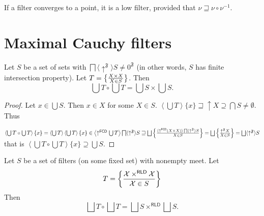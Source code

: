 \begin{cor}
  If a filter converges to a point, it is a low filter, provided that $\nu
  \sqsupseteq \nu \circ \nu^{- 1}$.
\end{cor}

\section{Maximal Cauchy filters}

\begin{lem}
  Let $S$ be a set of sets with $\bigsqcap \langle \uparrow^{\mathfrak{F}}
  \rangle S \neq 0^{\mathfrak{F}}$ (in other words, $S$ has finite
  intersection property). Let $T = \left\{ \frac{ X \times X}{X \in S }\right\}$. Then
  \[ \bigcup T \circ \bigcup T = \bigcup S \times \bigcup S. \]
\end{lem}

\begin{proof}
  Let $x \in \bigcup S$. Then $x \in X$ for some $X \in S$. $\left\langle
  \bigcup T \right\rangle \{ x \} \sqsupseteq \uparrow X \supseteq \bigcap S
  \neq \emptyset$. Thus
  
  $\left\langle \bigcup T \circ \bigcup T \right\rangle \{ x \} = \left\langle
  \bigcup T \right\rangle \left\langle \bigcup T \right\rangle \{ x \} \in
  \left\langle \uparrow^{\mathsf{FCD}} \bigcup T \right\rangle
  \bigsqcap \langle \uparrow^{\mathfrak{F}} \rangle S \sqsupseteq \bigsqcup
  \setcond{ \langle \uparrow^{\mathsf{FCD}} (X \times X) \rangle
  \bigsqcap \langle \uparrow^{\mathfrak{F}} \rangle S }{
  X \in S } = \bigsqcup \setcond{ \uparrow^{\mathfrak{F}} X}{X \in S } =
  \bigsqcup \langle
  \uparrow^{\mathfrak{F}} \rangle S$ that is $\left\langle \bigcup T \circ
  \bigcup T \right\rangle \{ x \} \supseteq \bigcup S$.
\end{proof}

\begin{cor}
  Let $S$ be a set of filters (on some fixed set) with nonempty meet. Let
  \[ T = \left\{ \frac{ \mathcal{X} \times^{\mathsf{RLD}} \mathcal{X} }{\mathcal{X} \in S}\right\} \]
  Then
  \[ \bigsqcup T \circ \bigsqcup T = \bigsqcup S \times^{\mathsf{RLD}}
     \bigsqcup S. \]
\end{cor}

